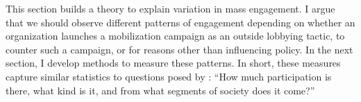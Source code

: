 

This section builds a theory to explain variation in mass engagement.
I argue that we should observe different patterns of engagement depending on whether an organization launches a mobilization campaign as an outside lobbying tactic, to counter such a campaign, or for reasons other than influencing policy. In the next section, I develop methods to measure these patterns. In short, these measures capture similar statistics to questions posed by \citet[p. 9]{Verba1987}: ``How much participation is there, what kind is it, and from what segments of society does it come?'' %


